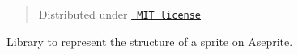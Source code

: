 \begin{quote}
Distributed under \href{LICENSE.txt}{\texttt{ MIT license}} \end{quote}
Library to represent the structure of a sprite on Aseprite. 